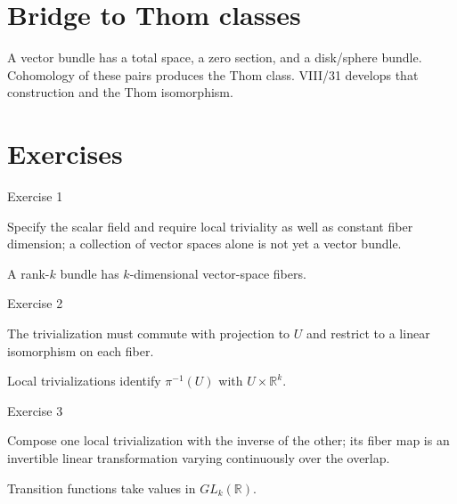 \section{Bridge to Thom classes}

A vector bundle has a total space, a zero section, and a disk/sphere bundle.
Cohomology of these pairs produces the Thom class.  VIII/31 develops that
construction and the Thom isomorphism.


\section{Exercises}

\begin{exercise}\label{exr:viii30-01}
Exercise 1
\end{exercise}
\begin{hint}
Specify the scalar field and require local triviality as well as constant fiber dimension; a collection of vector spaces alone is not yet a vector bundle.
\end{hint}
\begin{solution}
A rank-\(k\) bundle has \(k\)-dimensional vector-space fibers.
\end{solution}

\begin{exercise}\label{exr:viii30-02}
Exercise 2
\end{exercise}
\begin{hint}
The trivialization must commute with projection to \(U\) and restrict to a linear isomorphism on each fiber.
\end{hint}
\begin{solution}
Local trivializations identify \(\pi^{-1}(U)\) with \(U\times\mathbb R^k\).
\end{solution}

\begin{exercise}\label{exr:viii30-03}
Exercise 3
\end{exercise}
\begin{hint}
Compose one local trivialization with the inverse of the other; its fiber map is an invertible linear transformation varying continuously over the overlap.
\end{hint}
\begin{solution}
Transition functions take values in \(GL_k(\mathbb R)\).
\end{solution}

